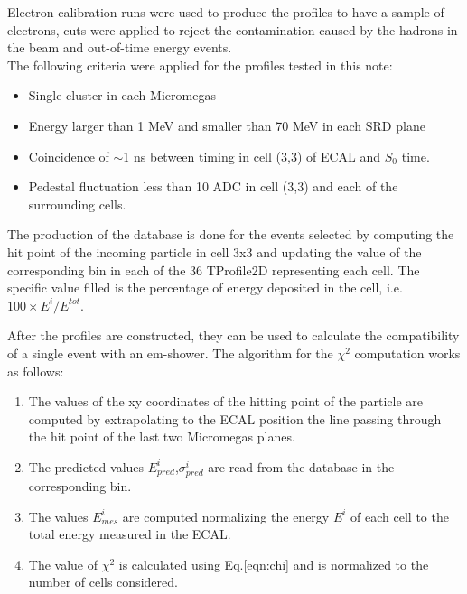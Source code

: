 Electron calibration runs were used to produce the profiles to have a sample of electrons, cuts were applied to reject the contamination caused by the hadrons in the beam and out-of-time energy events. \\
The following criteria were applied for the profiles tested in this note:

\begin{itemize}
\item Single cluster in each Micromegas
\item Energy larger than 1 MeV and smaller than 70 MeV in each SRD
  plane
\item Coincidence of $\sim$1 ns between timing in cell (3,3) of ECAL
  and $S_0$ time.
\item Pedestal fluctuation less than 10 ADC in cell (3,3) and each of
  the surrounding cells.
\end{itemize}

The production of the database is done for the events selected by computing the hit point of the incoming particle in cell
3x3 and updating the value of the corresponding bin in each of the 36
TProfile2D representing each cell. The specific value filled is the
percentage of energy deposited in the cell, i.e. $100 \times E^i/E^{tot}$.

After the profiles are constructed, they can be used to calculate the compatibility of a single event with an em-shower. The algorithm for the $\chi^2$ computation works as follows:
\begin{enumerate}
\item The values of the xy coordinates of the hitting point of the particle are computed by extrapolating to the ECAL position the line passing through the hit point of the last two Micromegas planes.
\item The predicted values $E_{pred}^i$,$\sigma^{i}_{pred}$ are read from the database in the corresponding bin.
\item The values $E_{mes}^i$ are computed normalizing the energy $E^i$ of each cell to the total energy measured in the ECAL.
\item The value of $\chi^2$ is calculated using Eq.\ref{eqn:chi} and is normalized to the number of cells considered.
\end{enumerate}

